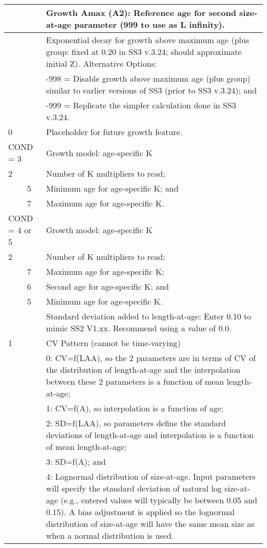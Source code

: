 \begin{longtable}{p{0.5cm} p{2cm} p{12cm}}
	\Tstrut 25 & & Growth Amax (A2): Reference age for second size-at-age parameter (999 to use as L infinity).\Bstrut\\
	\hline
	
	\Tstrut 0.20 & & Exponential decay for growth above maximum age (plus group: fixed at 0.20 in SS3 v.3.24; should approximate initial Z). Alternative Options: \\
			     & & -998 = Disable growth above maximum age (plus group) similar to earlier versions of SS3 (prior to SS3 v.3.24); and\\
			     & & -999 = Replicate the simpler calculation done in SS3 v.3.24.\Bstrut\\
	\hline
	
	0   & & Placeholder for future growth feature. \Tstrut\Bstrut\\
	\hline

	\multicolumn{2}{l}{COND = 3} & Growth model: age-specific K \Tstrut\\
	2 & & Number of K multipliers to read;\\
	& 5 & Minimum age for age-specific K; and\\
	& 7 & Maximum age for age-specific K.\Bstrut\\
	
	\multicolumn{2}{l}{COND = 4 or 5} & Growth model: age-specific K \Tstrut\\
	2 & & Number of K multipliers to read;\\
  	  & 7 & Maximum age for age-specific K;\\
	  & 6 & Second age for age-specific K; and\\
	  & 5 & Minimum age for age-specific K.\Bstrut\\
	\hline

	\Tstrut 0 & & Standard deviation added to length-at-age: Enter 0.10 to mimic SS2 V1.xx. Recommend using a value of 0.0.\Bstrut\\
	\hline

	1 & & CV Pattern (cannot be time-varying) \Tstrut\\
	  & & 0: CV=f(LAA), so the 2 parameters are in terms of CV of the distribution of length-at-age and the interpolation between these 2 parameters is a function of mean length-at-age;\\
	  & & 1: CV=f(A), so interpolation is a function of age;\\
	  & & 2: SD=f(LAA), so parameters define the standard deviations of length-at-age and interpolation is a function of mean length-at-age;\\
	  & & 3: SD=f(A); and \\
	  & & 4: Lognormal distribution of size-at-age.  Input parameters will specify the standard deviation of natural log size-at-age (e.g., entered values will typically be between 0.05 and 0.15). A bias adjustment is applied so the lognormal distribution of size-at-age will have the same mean size as when a normal distribution is used.\Bstrut\\
	\hline
\end{longtable}


